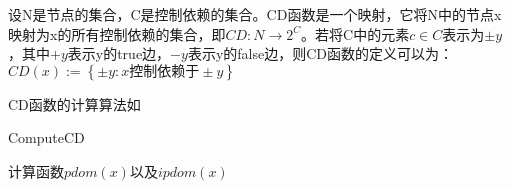 \begin{definition}[CD函数]
设N是节点的集合，C是控制依赖的集合。CD函数是一个映射，它将N中的节点x映射为x的所有控制依赖的集合，即$CD:N\to 2^C$。若将C中的元素$c\in C$表示为$\pm y$，其中$+y$表示y的true边，$-y$表示y的false边，则CD函数的定义可以为：$CD\left(x\right):=\left\{\pm y:x\text{控制依赖于}\pm y\right\}$
\end{definition}
CD函数的计算算法如

\begin{algorithm}[H]
	\label{alg:ComputeCD}
	\caption{ComputeCD}
	计算函数$pdom\left(x\right)$以及$ipdom\left(x\right)$\;
\end{algorithm}